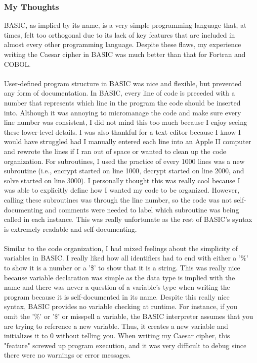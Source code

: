\documentclass[letterpaper, 10pt, DIV=13]{scrartcl}
\numberwithin{equation}{section}
\numberwithin{figure}{section}
\numberwithin{table}{section}
\begin{document}
\subsubsection{My Thoughts}
BASIC, as implied by its name, is a very simple programming language that, at times, felt too orthogonal due to its lack of key features that are included in almost every other programming language. Despite these flaws, my experience writing the Caesar cipher in BASIC was much better than that for Fortran and COBOL.
\\ \\
User-defined program structure in BASIC was nice and flexible, but prevented any form of documentation. In BASIC, every line of code is preceded with a number that represents which line in the program the code should be inserted into. Although it was annoying to micromanage the code and make sure every line number was consistent, I did not mind this too much because I enjoy seeing these lower-level details. I was also thankful for a text editor because I know I would have struggled had I manually entered each line into an Apple II computer and rewrote the lines if I ran out of space or wanted to clean up the code organization. For subroutines, I used the practice of every 1000 lines was a new subroutine (i.e., encrypt started on line 1000, decrypt started on line 2000, and solve started on line 3000). I personally thought this was really cool because I was able to explicitly define how I wanted my code to be organized. However, calling these subroutines was through the line number, so the code was not self-documenting and comments were needed to label which subroutine was being called in each instance. This was really unfortunate as the rest of BASIC's syntax is extremely readable and self-documenting.
\\ \\
Similar to the code organization, I had mixed feelings about the simplicity of variables in BASIC. I really liked how all identifiers had to end with either a '\%' to show it is a number or a '\$' to show that it is a string. This was really nice because variable declaration was simple as the data type is implied with the name and there was never a question of a variable's type when writing the program because it is self-documented in its name. Despite this really nice syntax, BASIC provides no variable checking at runtime. For instance, if you omit the '\%' or '\$' or misspell a variable, the BASIC interpreter assumes that you are trying to reference a new variable. Thus, it creates a new variable and initializes it to 0 without telling you. When writing my Caesar cipher, this "feature" screwed up program execution, and it was very difficult to debug since there were no warnings or error messages.
\end{document}
